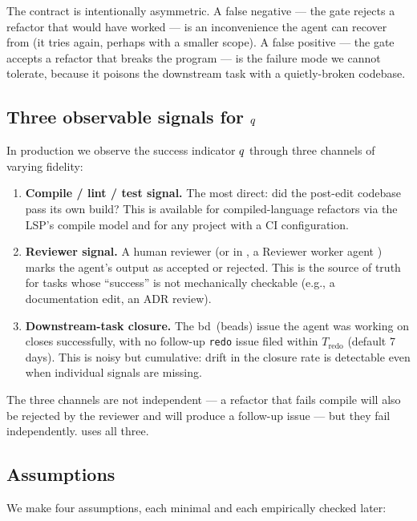 The contract is intentionally asymmetric. A false negative --- the
gate rejects a refactor that would have worked --- is an inconvenience
the agent can recover from (it tries again, perhaps with a smaller
scope). A false positive --- the gate accepts a refactor that breaks
the program --- is the failure mode we cannot tolerate, because it
poisons the downstream task with a quietly-broken codebase.

\subsection{Three observable signals for $q$}
\label{sec:problem:success}

In production we observe the success indicator $q$ through
three channels of varying fidelity:

\begin{enumerate}[leftmargin=*]
  \item \textbf{Compile / lint / test signal.} The most direct: did
        the post-edit codebase pass its own build? This is available
        for compiled-language refactors via the LSP's compile model
        and for any project with a CI configuration.
  \item \textbf{Reviewer signal.} A human reviewer (or in
        \blackrim, a Reviewer worker agent
        \cite{blackrim_paper_repo}) marks the agent's output as
        accepted or rejected. This is the source of truth for tasks
        whose ``success'' is not mechanically checkable (e.g., a
        documentation edit, an ADR review).
  \item \textbf{Downstream-task closure.} The bd~(beads) issue the
        agent was working on closes successfully, with no follow-up
        \texttt{redo} issue filed within $T_\text{redo}$ (default 7
        days). This is noisy but cumulative: drift in the closure
        rate is detectable even when individual signals are missing.
\end{enumerate}

The three channels are not independent --- a refactor that fails
compile will also be rejected by the reviewer and will produce a
follow-up issue --- but they fail independently.  uses
all three.

\subsection{Assumptions}

We make four assumptions, each minimal and each empirically checked
later:

